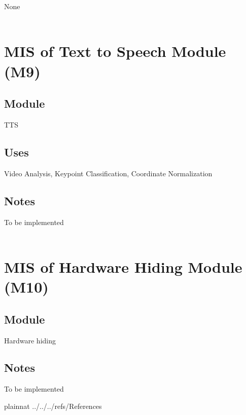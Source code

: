 \documentclass[12pt, titlepage]{article}
\begin{document}
None\\

\newpage
~\newpage

\section{MIS of Text to Speech Module (M9)} \label{M9}

\subsection{Module}

TTS\\

\subsection{Uses}

Video Analysis, Keypoint Classification, Coordinate Normalization\\

\subsection{Notes}

To be implemented\\

\newpage
~\newpage

\section{MIS of Hardware Hiding Module (M10)} \label{M10}

\subsection{Module}

Hardware hiding\\

\subsection{Notes}

To be implemented\\

\newpage

 {plainnat}
 {../../../refs/References}
\end{document}
